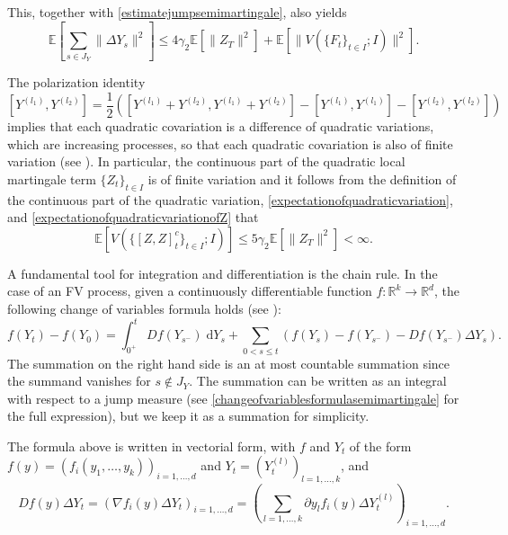 \documentclass[reqno,12pt]{amsart}
\theoremstyle{plain} %
\theoremstyle{definition} %
\begin{document}
This, together with \cref{estimatejumpsemimartingale}, also yields
\begin{equation}
    \label{expectationsquaredjumps}
    \mathbb{E}\left[\sum_{s\in J_{Y}} \|\Delta Y_s\|^2 \right] \leq 4\gamma_2\mathbb{E}\left[\|Z_T\|^2\right] + \mathbb{E}\left[\|V(\{F_t\}_{t\in I}; I)\|^2\right].
\end{equation}

The polarization identity
\[ [Y^{(l_1)}, Y^{(l_2)}] = \frac{1}{2}\left([Y^{(l_1)} + Y^{(l_2)}, Y^{(l_1)} + Y^{(l_2)}] - [Y^{(l_1)}, Y^{(l_1)}] - [Y^{(l_2)}, Y^{(l_2)}]\right)
\]
implies that each quadratic covariation is a difference of quadratic variations, which are increasing processes, so that each quadratic covariation is also of finite variation (see \cite[Corollary 1 of Theorem II.22]{Protter2005}). In particular, the continuous part of the quadratic local martingale term $\{Z_t\}_{t\in I}$ is of finite variation and it follows from the definition of the continuous part of the quadratic variation, \cref{expectationofquadraticvariation}, and \cref{expectationofquadraticvariationofZ} that
\begin{equation}
    \label{eqquadraticvarcovarfiniteexpectation}
    \mathbb{E}\left[V(\{[Z, Z]_t^c\}_{t\in I}; I)\right] \leq 5\gamma_2\mathbb{E}\left[\|Z_T\|^2\right] < \infty.
\end{equation}

A fundamental tool for integration and differentiation is the chain rule. In the case of an FV process, given a continuously differentiable function $f:\mathbb{R}^k \rightarrow \mathbb{R}^d$, the following change of variables formula holds (see \cite[Theorems II.31 and II.33]{Protter2005}):
\begin{equation}
    f(Y_t) - f(Y_0) = \int_{0^+}^t Df(Y_{s^-}) \;\mathrm{d}Y_s + \sum_{0 < s \leq t} \left( f(Y_s) - f(Y_{s^{-}}) - Df(Y_{s^-})\Delta Y_s\right).
\end{equation}
The summation on the right hand side is an at most countable summation since the summand vanishes for $s \notin J_{Y}$. The summation can be written as an integral with respect to a jump measure (see \cref{changeofvariablesformulasemimartingale} for the full expression), but we keep it as a summation for simplicity.

The formula above is written in vectorial form, with $f$ and $Y_t$ of the form $f(y)=(f_i(y_1, \ldots, y_k))_{i=1, \ldots, d}$ and $Y_t = (Y_t^{(l)})_{l=1, \ldots, k}$, and
\[
    Df(y)\Delta Y_t = \left( \nabla f_i(y)\Delta Y_t\right)_{i=1, \ldots, d} = \left( \sum_{l=1, \ldots, k} \partial y_l f_i(y) \Delta Y_t^{(l)} \right)_{i=1, \ldots, d}.
\]
\end{document}
